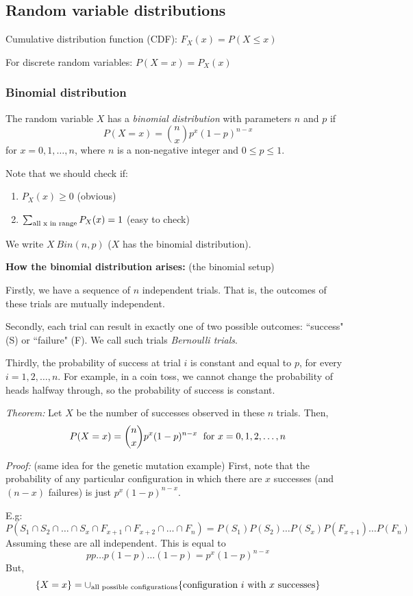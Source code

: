\documentclass[12pt]{article}
\begin{document}
\subsection{Random variable distributions}
Cumulative distribution function (CDF): $F_X (x) = P(X \leq x)$

For discrete random variables: $P(X = x) = P_X (x)$

\subsubsection{Binomial distribution}

The random variable $X$ has a \emph{binomial distribution} with parameters $n$ and $p$ if
\[
	P(X = x) = {n \choose x} p^x (1-p)^{n-x}
\]
for $x = 0, 1, \ldots, n$, where $n$ is a non-negative integer and $0 \leq p \leq 1$.

Note that we should check if:
\begin{enumerate}
	\item $P_X (x) \geq 0$ (obvious)
	\item $\sum_{\textnormal{all x in range}} P_X (x) = 1$ (easy to check)
\end{enumerate}

We write $X ~ Bin (n, p)$ ($X$ has the binomial distribution).

\textbf{How the binomial distribution arises:} (the binomial setup)

Firstly, we have a sequence of $n$ independent trials. That is, the outcomes of these trials are mutually independent.

Secondly, each trial can result in exactly one of two possible outcomes: ``success" (S) or ``failure" (F). We call such trials \emph{Bernoulli trials}.

Thirdly, the probability of success at trial $i$ is constant and equal to $p$, for every $i = 1, 2, \ldots, n$. For example, in a coin toss, we cannot change the probability of heads halfway through, so the probability of success is constant.

\emph{Theorem:} Let $X$ be the number of successes observed in these $n$ trials. Then,
\[
	P(X = x) = {n \choose x} p^x (1-p)^{n - x} \; \textnormal{ for } x = 0,1,2,\ldots, n
\]

\emph{Proof:} (same idea for the genetic mutation example) First, note that the probability of any particular configuration in which there are $x$ successes (and $(n-x)$ failures) is just $p^x (1-p)^{n-x}$.

E.g:
\[ P(S_1 \cap S_2 \cap \ldots \cap S_x \cap F_{x+1} \cap F_{x+2} \cap \ldots \cap F_n) = P(S_1) P(S_2) \ldots P(S_x) P(F_{x+1}) \ldots P(F_n) \]
Assuming these are all independent. This is equal to
\[
	p p \ldots p (1-p) \ldots (1-p) = p^x (1-p)^{n-x}
\]
But,
\[
	\{ X = x \} = \cup_{\textnormal{all possible configurations}} \{ \textnormal{configuration $i$ with $x$ successes} \}
\]
\end{document}
